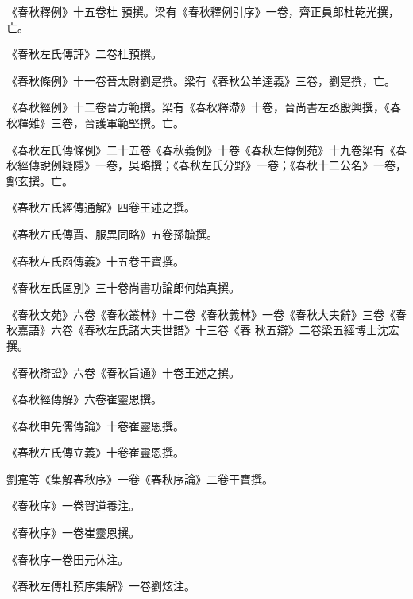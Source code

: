 \begin{pinyinscope}
 《春秋釋例》十五卷杜
 預撰。梁有《春秋釋例引序》一卷，齊正員郎杜乾光撰，亡。



 《春秋左氏傳評》二卷杜預撰。



 《春秋條例》十一卷晉太尉劉寔撰。梁有《春秋公羊達義》三卷，劉寔撰，亡。



 《春秋經例》十二卷晉方範撰。梁有《春秋釋滯》十卷，晉尚書左丞殷興撰，《春秋釋難》三卷，晉護軍範堅撰。亡。



 《春秋左氏傳條例》二十五卷《春秋義例》十卷《春秋左傳例苑》十九卷梁有《春秋經傳說例疑隱》一卷，吳略撰；《春秋左氏分野》一卷；《春秋十二公名》一卷，鄭玄撰。亡。



 《春秋左氏經傳通解》四卷王述之撰。



 《春秋左氏傳賈、服異同略》五卷孫毓撰。



 《春秋左氏函傳義》十五卷干寶撰。



 《春秋左氏區別》三十卷尚書功論郎何始真撰。



 《春秋文苑》六卷《春秋叢林》十二卷《春秋義林》一卷《春秋大夫辭》三卷《春秋嘉語》六卷《春秋左氏諸大夫世譜》十三卷《春
 秋五辯》二卷梁五經博士沈宏撰。



 《春秋辯證》六卷《春秋旨通》十卷王述之撰。



 《春秋經傳解》六卷崔靈恩撰。



 《春秋申先儒傳論》十卷崔靈恩撰。



 《春秋左氏傳立義》十卷崔靈恩撰。



 劉寔等《集解春秋序》一卷《春秋序論》二卷干寶撰。



 《春秋序》一卷賀道養注。



 《春秋序》一卷崔靈恩撰。



 《春秋序一卷田元休注。



 《春秋左傳杜預序集解》一卷劉炫注。




\end{pinyinscope}
